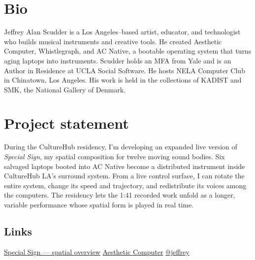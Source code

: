 \documentclass[14pt,letterpaper]{extarticle}
\begin{document}
\thispagestyle{fancy}


\section{Bio}
Jeffrey Alan Scudder is a Los Angeles–based artist, educator, and technologist
who builds musical instruments and creative tools. He created Aesthetic
Computer, Whistlegraph, and AC Native, a bootable operating system that turns
aging laptops into instruments. Scudder holds an MFA from Yale and is an Author
in Residence at UCLA Social Software. He hosts NELA Computer Club in Chinatown,
Los Angeles. His work is held in the collections of KADIST and SMK, the National
Gallery of Denmark.

\clearpage
{}
\workingtitle

\vspace{0.55em}

\section{Project statement}
During the CultureHub residency, I’m developing an expanded live version of
\emph{Special Sign}, my spatial composition for twelve moving sound bodies. Six
salvaged laptops booted into AC Native become a distributed instrument inside
CultureHub LA’s surround system. From a live control surface, I can rotate the
entire system, change its speed and trajectory, and redistribute its voices
among the computers. The residency lets the 1:41 recorded work unfold as a
longer, variable performance whose spatial form is played in real time.

\subsection{Links}
\href{https://assets.aesthetic.computer/pop/nullabye/special-sign/special-sign-3d-spatial-overview.mp4}{Special Sign — spatial overview}\quad
\href{https://aesthetic.computer}{Aesthetic Computer}\quad
\href{https://prompt.ac/@jeffrey}{@jeffrey}
\end{document}
